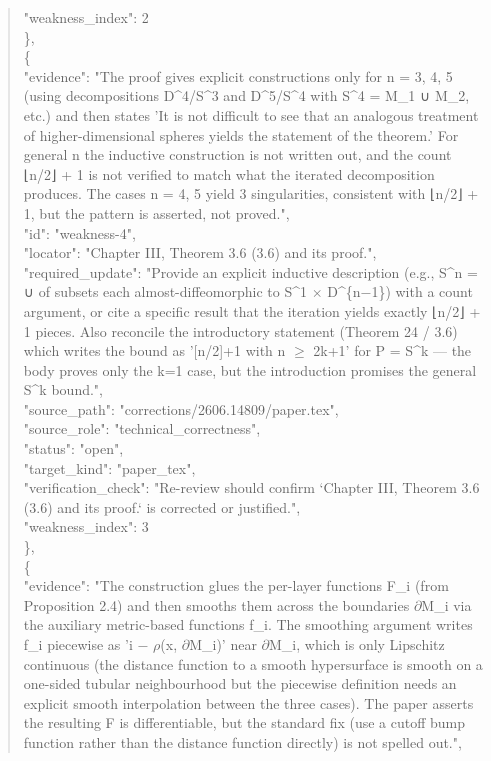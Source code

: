\documentclass[11pt]{article}
\begin{document}
\begin{quote}
      "weakness\_index": 2\\
    \},\\
    \{\\
      "evidence": "The proof gives explicit constructions only for n = 3, 4, 5 (using decompositions D\^{}4/S\^{}3 and D\^{}5/S\^{}4 with S\^{}4 = M\_1 ∪ M\_2, etc.) and then states 'It is not difficult to see that an analogous treatment of higher-dimensional spheres yields the statement of the theorem.' For general n the inductive construction is not written out, and the count ⌊n/2⌋ + 1 is not verified to match what the iterated decomposition produces. The cases n = 4, 5 yield 3 singularities, consistent with ⌊n/2⌋ + 1, but the pattern is asserted, not proved.",\\
      "id": "weakness-4",\\
      "locator": "Chapter III, Theorem 3.6 (3.6) and its proof.",\\
      "required\_update": "Provide an explicit inductive description (e.g., S\^{}n = ∪ of subsets each almost-diffeomorphic to S\^{}1 \ensuremath{\times} D\^{}\{n\ensuremath{-}1\}) with a count argument, or cite a specific result that the iteration yields exactly ⌊n/2⌋ + 1 pieces. Also reconcile the introductory statement (Theorem 24 / 3.6) which writes the bound as '[n/2]+1 with n \ensuremath{\ge} 2k+1' for P = S\^{}k --- the body proves only the k=1 case, but the introduction promises the general S\^{}k bound.",\\
      "source\_path": "corrections/2606.14809/paper.tex",\\
      "source\_role": "technical\_correctness",\\
      "status": "open",\\
      "target\_kind": "paper\_tex",\\
      "verification\_check": "Re-review should confirm `Chapter III, Theorem 3.6 (3.6) and its proof.` is corrected or justified.",\\
      "weakness\_index": 3\\
    \},\\
    \{\\
      "evidence": "The construction glues the per-layer functions F\_i (from Proposition 2.4) and then smooths them across the boundaries \ensuremath{\partial}M\_i via the auxiliary metric-based functions f\_i. The smoothing argument writes f\_i piecewise as 'i \ensuremath{-} \ensuremath{\rho}(x, \ensuremath{\partial}M\_i)' near \ensuremath{\partial}M\_i, which is only Lipschitz continuous (the distance function to a smooth hypersurface is smooth on a one-sided tubular neighbourhood but the piecewise definition needs an explicit smooth interpolation between the three cases). The paper asserts the resulting F is differentiable, but the standard fix (use a cutoff bump function rather than the distance function directly) is not spelled out.",\\

\end{quote}
\end{document}
